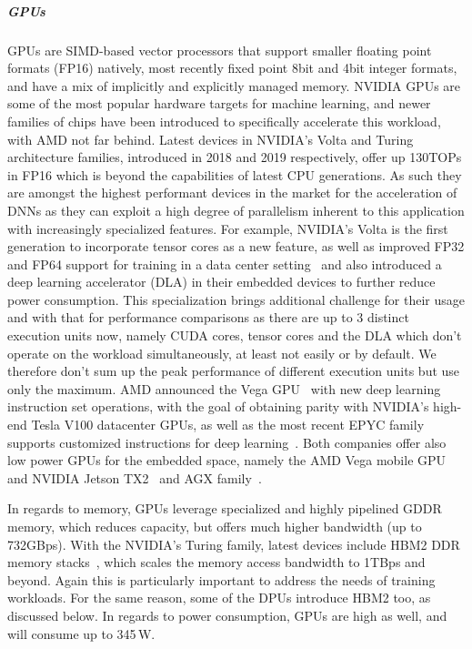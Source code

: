 \subparagraph{GPUs} GPUs are SIMD-based vector processors that support smaller floating point formats (FP16) natively, most recently fixed point 8bit and 4bit integer formats, and have a mix of implicitly and explicitly managed memory. 
NVIDIA GPUs are some of the most popular hardware targets for machine learning, and newer families of chips have been introduced to specifically accelerate this workload, with AMD not far behind. 
Latest devices in NVIDIA's Volta and Turing architecture families, introduced in 2018 and 2019 respectively, offer up 130TOPs in FP16 which is beyond the capabilities of latest CPU generations. 
As such they are amongst the highest performant devices in the market for the acceleration of DNNs as they can exploit a high degree of parallelism inherent to this application with increasingly specialized features.
For example, NVIDIA's Volta is the first generation to incorporate tensor cores as a new feature, as well as improved FP32 and FP64 support for training in a data center setting~\cite{NVIDIAv100} and also introduced a deep learning accelerator (DLA) in their embedded devices to further reduce power consumption. This specialization brings additional challenge for their usage and with that for performance comparisons as there are up to 3 distinct execution units now, namely CUDA cores, tensor cores and the DLA which don't operate on the workload simultaneously, at least not easily or by default. 
We therefore don't sum up the peak performance of different execution units but use only the maximum.
AMD announced the Vega GPU~\cite{RadeonInstinctGPU} with new deep learning instruction set operations, with the goal of obtaining parity with NVIDIA's high-end Tesla V100 datacenter GPUs, as well as the most recent EPYC family supports customized instructions for deep learning~\cite{epyc}. 
Both companies offer also low power GPUs for the embedded space, namely the AMD Vega mobile GPU~\cite{radeon-mobile} and NVIDIA Jetson TX2~\cite{nvidia-jetson} and AGX family~\cite{agx}.

In regards to memory, GPUs leverage specialized and highly pipelined GDDR memory, which reduces capacity, but offers much higher bandwidth (up to 732GBps). With the NVIDIA's Turing family, latest devices include HBM2 DDR memory stacks~\cite{turing}, which scales the memory access bandwidth to 1TBps and beyond. 
Again this is particularly important to address the needs of training workloads.
For the same reason, some of the DPUs introduce HBM2 too, as discussed below. 
In regards to power consumption, GPUs are high as well, and will consume up to 345\,W.

